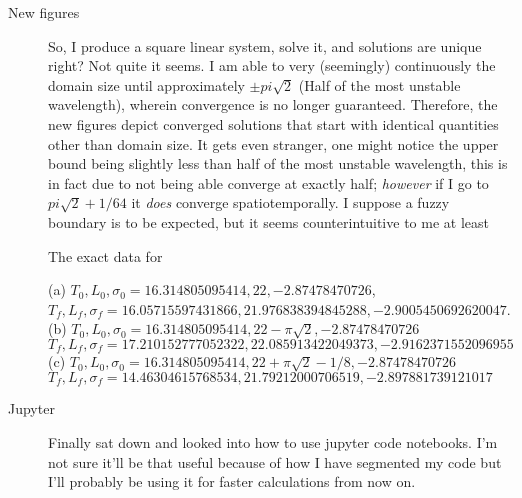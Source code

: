 \begin{description}
{\begin{description}
\item[New figures]
So, I produce a square linear system, solve it, and solutions are unique right? Not quite it seems.
I am able to very (seemingly) continuously the domain size until approximately $\pm pi \sqrt{2}$ (Half
of the most unstable wavelength), wherein convergence is no longer guaranteed. Therefore, the new
figures depict converged solutions that start with identical quantities other than domain size. It gets
even stranger, one might notice the upper bound being slightly less than half of the most unstable wavelength,
this is in fact due to not being able converge at exactly half; \emph{however} if I go to $pi \sqrt{2} + 1/64$
it \emph{does} converge spatiotemporally. I suppose a fuzzy boundary is to be expected,
but it seems counterintuitive to me at least

The exact data for 

(a) $T_0,L_0,\sigma_0=16.314805095414,22, -2.87478470726$, \\
$T_f,L_f,\sigma_f=16.05715597431866,21.976838394845288,-2.9005450692620047$. \\

(b) $T_0,L_0,\sigma_0=16.314805095414,22 - \pi \sqrt{2}, -2.87478470726$ \\
$T_f,L_f,\sigma_f=17.210152777052322,22.085913422049373, -2.9162371552096955$ \\

(c) $T_0,L_0,\sigma_0=16.314805095414,22 + \pi \sqrt{2}-1/8,-2.87478470726$ \\
$T_f,L_f,\sigma_f=14.46304615768534,21.79212000706519,-2.897881739121017$ \\

\item[Jupyter]
Finally sat down and looked into how to use jupyter code notebooks. I'm not sure it'll be that useful because of how
I have segmented my code but I'll probably be using it for faster calculations from now on.
\end{description}
}

\end{description}
